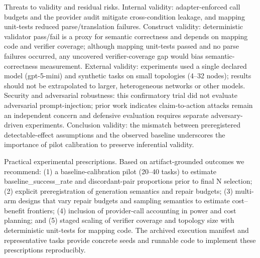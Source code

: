 \documentclass[conference]{IEEEtran}
\begin{document}
Threats to validity and residual risks. Internal validity: adapter-enforced call budgets and the provider audit mitigate cross-condition leakage, and mapping unit-tests reduced parse/translation failures. Construct validity: deterministic validator pass/fail is a proxy for semantic correctness and depends on mapping code and verifier coverage; although mapping unit-tests passed and no parse failures occurred, any uncovered verifier-coverage gap would bias semantic-correctness measurement. External validity: experiments used a single declared model (gpt-5-mini) and synthetic tasks on small topologies (4--32 nodes); results should not be extrapolated to larger, heterogeneous networks or other models. Security and adversarial robustness: this confirmatory trial did not evaluate adversarial prompt-injection; prior work indicates claim-to-action attacks remain an independent concern and defensive evaluation requires separate adversary-driven experiments. Conclusion validity: the mismatch between preregistered detectable-effect assumptions and the observed baseline underscores the importance of pilot calibration to preserve inferential validity.

Practical experimental prescriptions. Based on artifact-grounded outcomes we recommend: (1) a baseline-calibration pilot (20--40 tasks) to estimate baseline\_success\_rate and discordant-pair proportions prior to final N selection; (2) explicit preregistration of generation semantics and repair budgets; (3) multi-arm designs that vary repair budgets and sampling semantics to estimate cost--benefit frontiers; (4) inclusion of provider-call accounting in power and cost planning; and (5) staged scaling of verifier coverage and topology size with deterministic unit-tests for mapping code. The archived execution manifest and representative tasks provide concrete seeds and runnable code to implement these prescriptions reproducibly.
\end{document}
